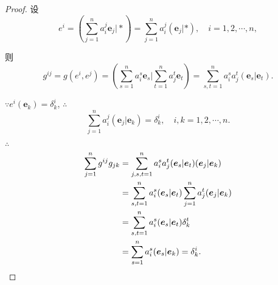 \documentclass[color=black,device=normal,lang=cn,mode=geye]{elegantnote}
\begin{document}
\begin{proof}
    设
    \[e^i=\left(\sum\limits_{j=1}^na_i^j\boldsymbol{e}_j\Bigg|*\right)=\sum\limits_{j=1}^na_i^j(\boldsymbol{e}_j|*),\quad i=1,2,\cdots,n,\]

    则
    \[g^{ij}=g(e^i,e^j)=\left(\sum\limits_{s=1}^na_i^s\boldsymbol{e}_s\Bigg|\sum\limits_{t=1}^na_j^t\boldsymbol{e}_t\right)=\sum\limits_{s,t=1}^na_i^sa_j^t(\boldsymbol{e}_s|\boldsymbol{e}_t).\]
    
    $\because e^i(\boldsymbol{e}_k)=\delta^i_k$, $\therefore$
    \[\sum\limits_{j=1}^na_i^j(\boldsymbol{e}_j|\boldsymbol{e}_k)=\delta^i_k,\quad i,k=1,2,\cdots,n.\]

    $\therefore$
    \begin{align*}
        \sum\limits_{j=1}^ng^{ij}g_{jk} & =\sum\limits_{j,s,t=1}^na_i^sa_j^t(\boldsymbol{e}_s|\boldsymbol{e}_t)(\boldsymbol{e}_j|\boldsymbol{e}_k) \\
        & =\sum\limits_{s,t=1}^na_i^s(\boldsymbol{e}_s|\boldsymbol{e}_t)\sum\limits_{j=1}^na_j^t(\boldsymbol{e}_j|\boldsymbol{e}_k) \\
        & =\sum\limits_{s,t=1}^na_i^s(\boldsymbol{e}_s|\boldsymbol{e}_t)\delta^t_k \\
        & =\sum\limits_{s=1}^na_i^s(\boldsymbol{e}_s|\boldsymbol{e}_k)=\delta^i_k.\qedhere
    \end{align*}
\end{proof}
\end{document}

